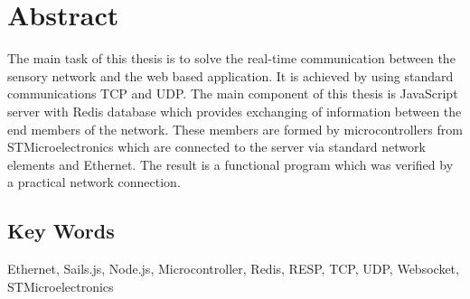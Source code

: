 \chapter*{Abstract}
The main task of this thesis is to solve the real-time communication between the sensory network and the web based application. It is achieved by using standard communications TCP and UDP. The main component of this thesis is JavaScript server with Redis database which provides exchanging of information between the end members of the network. These members are formed by microcontrollers from STMicroelectronics which are connected to the server via standard network elements and Ethernet. The result is a functional program which was verified by a practical network connection.

\vfill

\section*{Key Words}
Ethernet, Sails.js, Node.js, Microcontroller, Redis, RESP, TCP, UDP, Websocket, STMicroelectronics